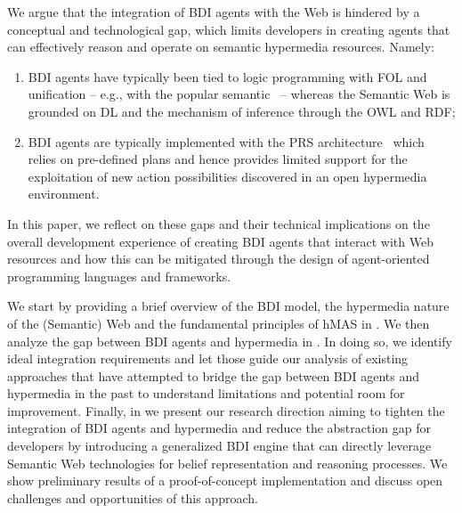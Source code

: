 \documentclass[
]{ceurart}
\begin{document}
We argue that the integration of \ac{BDI} agents with the Web
is hindered by a conceptual and technological gap, 
which limits developers in creating agents that can effectively reason and operate on semantic hypermedia resources.
Namely:
\begin{enumerate}[label={\roman*)}]
  \item \ac{BDI} agents have typically been tied to logic programming with \ac{FOL} and unification -- e.g., with the popular \agentspeak{} semantic~\missingref[agentspeak]{} --
  whereas the Semantic Web is grounded on \ac{DL} and the mechanism of inference through the \ac{OWL} and \ac{RDF};
  \label{itm:gap-logic}
  \item \ac{BDI} agents are typically implemented with the \ac{PRS} architecture~\missingref{} which relies on pre-defined plans and hence provides limited support for the exploitation of new action possibilities discovered in an open hypermedia environment.\label{itm:gap-planning}
\end{enumerate}

In this paper, we reflect on these gaps and their technical implications on the overall development experience of creating \ac{BDI} agents that interact with Web resources and how this can be mitigated through the design of agent-oriented programming languages and frameworks. 

We start by providing a brief overview of the \ac{BDI} model, the hypermedia nature of the (Semantic) Web and the fundamental principles of \ac{hMAS} in .
%
We then analyze the gap between \ac{BDI} agents and hypermedia in .
%
In doing so,
we identify ideal integration requirements and let those guide our analysis of existing approaches that have attempted to bridge the gap between \ac{BDI} agents and hypermedia in the past to understand limitations and potential room for improvement.
%
Finally, in  we present our research direction
aiming to tighten the integration of \ac{BDI} agents and hypermedia
and reduce the abstraction gap for developers 
by introducing a generalized \ac{BDI} engine
that can directly leverage Semantic Web technologies for belief representation and reasoning processes.
%
We show preliminary results of a proof-of-concept implementation
and discuss open challenges and opportunities of this approach.

\end{document}

